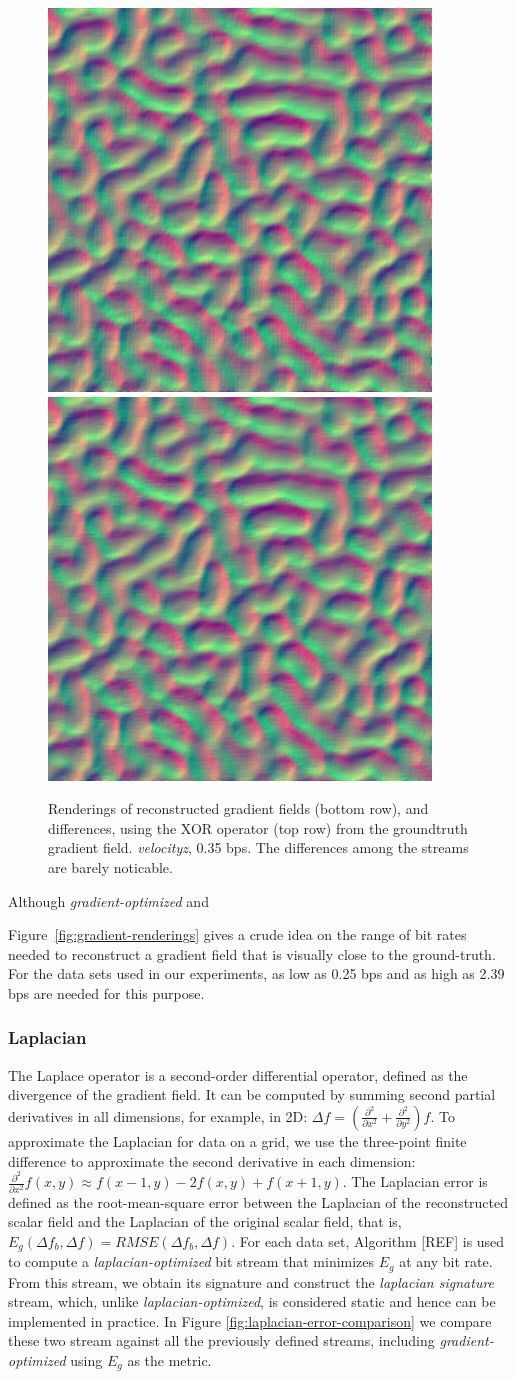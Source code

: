\begin{figure}[h]
{	{\includegraphics[width=0.23\linewidth]{img/gradient/gradient_2.png}}
	{\includegraphics[width=0.23\linewidth]{img/gradient/gradient_3.png}}}
	\caption{Renderings of reconstructed gradient fields (bottom row), and differences, using the XOR
	operator (top row) from the groundtruth gradient field. \emph{velocityz}, 0.35 bps. The
	differences among the streams are barely noticable.}
  \label{fig:gradient-rendering-diff}
\end{figure}

Although \emph{gradient-optimized} and \emph{}

Figure~\ref{fig:gradient-renderings} gives a crude idea on the range of bit rates needed to
reconstruct a gradient field that is visually close to the ground-truth. For the data sets used in
our experiments, as low as 0.25 bps and as high as 2.39 bps are needed for this purpose.

\subsubsection{Laplacian}
\label{sec:laplacian}

The Laplace operator is a second-order differential operator, defined as the divergence of the
gradient field. It can be computed by summing second partial derivatives in all dimensions, for
example, in 2D: $\Delta f=(\frac{{\partial}^2}{\partial{x^2}}+\frac{{\partial}^2}{\partial{y^2}})f$.
To approximate the Laplacian for data on a grid, we use the three-point finite difference to
approximate the second derivative in each dimension: $\frac{{\partial}^2}{\partial{x^2}}f(x,y)
\approx f(x-1,y)-2f(x,y)+f(x+1,y)$. The Laplacian error is defined as the root-mean-square error
between the Laplacian of the reconstructed scalar field and the Laplacian of the original scalar
field, that is, $E_g(\Delta f_b,\Delta f)=RMSE(\Delta f_b,\Delta f)$. For each data set, Algorithm
[REF] is used to compute a \emph{laplacian-optimized} bit stream that minimizes $E_g$ at any bit
rate. From this stream, we obtain its signature and construct the \emph{laplacian signature} stream,
which, unlike \emph{laplacian-optimized}, is considered static and hence can be implemented in
practice. In Figure \ref{fig:laplacian-error-comparison} we compare these two stream against all the
previously defined streams, including \emph{gradient-optimized} using $E_g$ as the metric.

